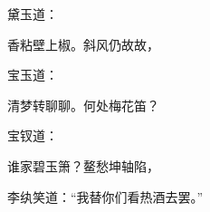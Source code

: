 \begin{parag}
    黛玉道：
\end{parag}
\begin{poem}
    \begin{pl} 香粘壁上椒。斜风仍故故，\end{pl}
\end{poem}
\begin{parag}
    宝玉道：
\end{parag}
\begin{poem}
    \begin{pl} 清梦转聊聊。何处梅花笛？\end{pl}
\end{poem}
\begin{parag}
    宝钗道：
\end{parag}
\begin{poem}
    \begin{pl} 谁家碧玉箫？鳌愁坤轴陷，\end{pl}
\end{poem}
\begin{parag}
    李纨笑道：“我替你们看热酒去罢。”
\end{parag}


